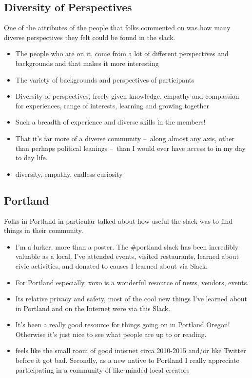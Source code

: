 \documentclass[
]{book}
\providecommand{\tightlist}{%
  \setlength{\itemsep}{0pt}\setlength{\parskip}{0pt}}
\begin{document}
\subsection{Diversity of Perspectives}\label{diversity-of-perspectives}

One of the attributes of the people that folks commented on was how many diverse perspectives they felt could be found in the slack.

\begin{itemize}
\tightlist
\item
  The people who are on it, come from a lot of different perspectives and backgrounds and that makes it more interesting
\item
  The variety of backgrounds and perspectives of participants
\item
  Diversity of perspectives, freely given knowledge, empathy and compassion for experiences, range of interests, learning and growing together
\item
  Such a breadth of experience and diverse skills in the members!
\item
  That it's far more of a diverse community --~along almost any axis, other than perhaps political leanings --~than I would ever have access to in my day to day life.
\item
  diversity, empathy, endless curiosity
\end{itemize}

\subsection{Portland}\label{portland}

Folks in Portland in particular talked about how useful the slack was to find things in their community.

\begin{itemize}
\tightlist
\item
  I'm a lurker, more than a poster. The \#portland slack has been incredibly valuable as a local. I've attended events, visited restaurants, learned about civic activities, and donated to causes I learned about via Slack.
\item
  For Portland especially, xoxo is a wonderful resource of news, vendors, events.
\item
  Its relative privacy and safety, most of the cool new things I've learned about in Portland and on the Internet were via this Slack.
\item
  It's been a really good resource for things going on in Portland Oregon! Otherwise it's just nice to see what people are up to or reading.
\item
  feels like the small room of good internet circa 2010-2015 and/or like Twitter before it got bad. Secondly, as a new native to Portland I really appreciate participating in a community of like-minded local creators
\end{itemize}
\end{document}
